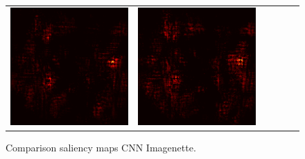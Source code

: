 \documentclass[preprint,12pt]{elsarticle}
\begin{document}
\begin{figure}[p]
\begin{tabular}{cccccc}
  \includegraphics[scale=\scale]{../visualizations/examples/imagenette/cnn/active_saliency_map/9.png} & 
  \includegraphics[scale=\scale]{../visualizations/examples/imagenette/cnn/inactive_saliency_map/9.png} \\
  \end{tabular}
  \caption{Comparison saliency maps CNN Imagenette.}
\end{figure}
\end{document}
